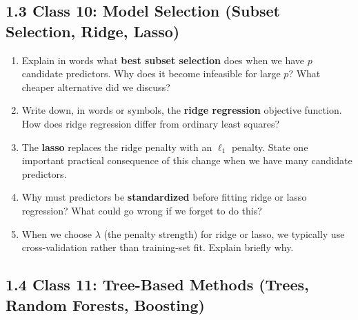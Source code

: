 \documentclass[11pt]{article}
\begin{document}
\subsection*{1.3 Class 10: Model Selection (Subset Selection, Ridge, Lasso)}

\begin{enumerate}[leftmargin=*, resume]

\item Explain in words what \textbf{best subset selection} does when we have $p$ candidate predictors. Why does it become infeasible for large $p$? What cheaper alternative did we discuss?

\item Write down, in words or symbols, the \textbf{ridge regression} objective function. How does ridge regression differ from ordinary least squares?

\item The \textbf{lasso} replaces the ridge penalty with an $\ell_1$ penalty. State one important practical consequence of this change when we have many candidate predictors.

\item Why must predictors be \textbf{standardized} before fitting ridge or lasso regression? What could go wrong if we forget to do this?

\item When we choose $\lambda$ (the penalty strength) for ridge or lasso, we typically use cross-validation rather than training-set fit. Explain briefly why.

\end{enumerate}


\subsection*{1.4 Class 11: Tree-Based Methods (Trees, Random Forests, Boosting)}
\end{document}

